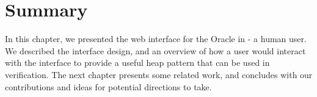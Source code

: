 \section*{Summary}
In this chapter, we presented the web interface for the Oracle in \verifier - a human user. We described the interface design, and an overview of how a user would interact with the interface to provide a useful heap pattern that can be used in verification. The next chapter presents some related work, and concludes with  our contributions and ideas for potential directions to take.